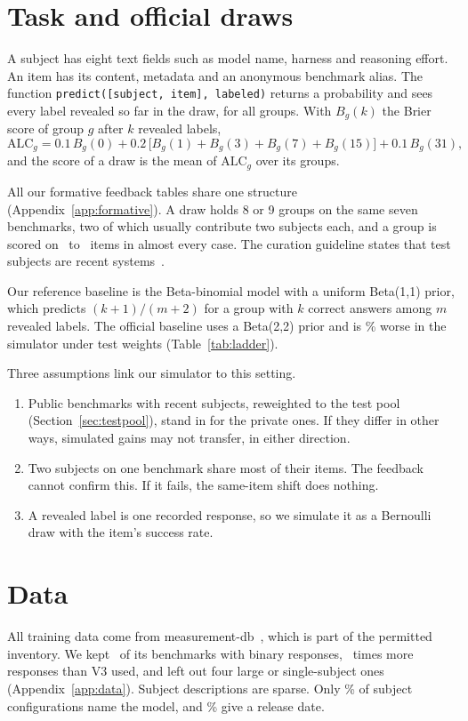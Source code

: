 \documentclass{article}
\begin{document}
\section{Task and official draws}
\label{sec:task}
A subject has eight text fields such as model name, harness and reasoning effort.
An item has its content, metadata and an anonymous benchmark alias.
The function \texttt{predict([subject, item], labeled)} returns a probability and sees every label revealed so far in the draw, for all groups.
With $B_g(k)$ the Brier score of group $g$ after $k$ revealed labels,
\begin{equation}
\mathrm{ALC}_g = 0.1\,B_g(0) + 0.2\,\bigl[B_g(1)+B_g(3)+B_g(7)+B_g(15)\bigr] + 0.1\,B_g(31),
\label{eq:alc}
\end{equation}
and the score of a draw is the mean of $\mathrm{ALC}_g$ over its groups.

All our formative feedback tables share one structure (Appendix~\ref{app:formative}).
A draw holds 8 or 9 groups on the same seven benchmarks, two of which usually contribute two subjects each, and a group is scored on \OffPairsMin\ to \OffPairsMax\ items in almost every case.
The curation guideline states that test subjects are recent systems~\citep{paiec}.

Our reference baseline is the Beta-binomial model with a uniform Beta(1,1) prior, which predicts $(k+1)/(m+2)$ for a group with $k$ correct answers among $m$ revealed labels. The official baseline uses a Beta(2,2) prior and is \PRCOBtwoAbs\% worse in the simulator under test weights (Table~\ref{tab:ladder}).

Three assumptions link our simulator to this setting.
\begin{enumerate}
\item[A1.] Public benchmarks with recent subjects, reweighted to the test pool (Section~\ref{sec:testpool}), stand in for the private ones. If they differ in other ways, simulated gains may not transfer, in either direction.
\item[A2.] Two subjects on one benchmark share most of their items. The feedback cannot confirm this. If it fails, the same-item shift does nothing.
\item[A3.] A revealed label is one recorded response, so we simulate it as a Bernoulli draw with the item's success rate.
\end{enumerate}

\section{Data}
\label{sec:data}
All training data come from measurement-db~\citep{mdb}, which is part of the permitted inventory.
We kept \NBenchKept\ of its benchmarks with binary responses, \TrialRatio\ times more responses than V3 used, and left out four large or single-subject ones (Appendix~\ref{app:data}).
Subject descriptions are sparse.
Only \PctName\% of subject configurations name the model, and \PctRelease\% give a release date.
\end{document}
